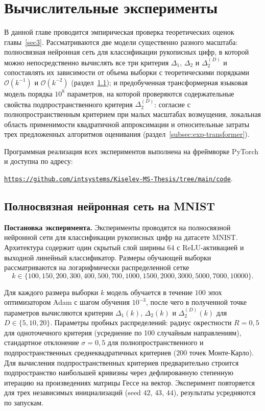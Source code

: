 \section{Вычислительные эксперименты}\label{sec4}

В данной главе проводится эмпирическая проверка теоретических оценок главы~\ref{sec3}. Рассматриваются две модели существенно разного масштаба: полносвязная нейронная сеть для классификации рукописных цифр, в которой можно непосредственно вычислять все три критерия $\Delta_1$, $\Delta_2$ и $\Delta_2^{(D)}$ и сопоставлять их зависимости от объема выборки с теоретическими порядками $\mathcal O(k^{-1})$ и $\mathcal O(k^{-2})$ (раздел~\ref{subsec:exp-mlp}); и предобученная трансформерная языковая модель порядка $10^8$ параметров, на которой проверяются содержательные свойства подпространственного критерия $\Delta_2^{(D)}$: согласие с полнопространственным критерием при малых масштабах возмущения, локальная область применимости квадратичной аппроксимации и относительные затраты трех предложенных алгоритмов оценивания (раздел~\ref{subsec:exp-transformer}).

Программная реализация всех экспериментов выполнена на фреймворке PyTorch и доступна по адресу:
\begin{center}
    \href{https://github.com/intsystems/Kiselev-MS-Thesis/tree/main/code}{\texttt{https://github.com/intsystems/Kiselev-MS-Thesis/tree/main/code}}.
\end{center}

\subsection{Полносвязная нейронная сеть на MNIST}\label{subsec:exp-mlp}

\textbf{Постановка эксперимента.} Эксперименты проводятся на полносвязной нейронной сети для классификации рукописных цифр на датасете MNIST. Архитектура содержит один скрытый слой ширины $64$ с ReLU-активацией и выходной линейный классификатор. Размеры обучающей выборки рассматриваются на логарифмически распределенной сетке
\[
k \in \{100, 150, 200, 300, 400, 500, 700, 1000, 1500, 2000, 3000, 5000, 7000, 10000\}.
\]

Для каждого размера выборки $k$ модель обучается в течение $100$ эпох оптимизатором Adam с шагом обучения $10^{-3}$, после чего в полученной точке параметров вычисляются критерии $\Delta_1(k)$, $\Delta_2(k)$ и $\Delta_2^{(D)}(k)$ для $D \in \{5, 10, 20\}$. Параметры пробных распределений: радиус окрестности $R=0{,}5$ для одноточечного критерия (усреднение по 100 случайным направлениям), стандартное отклонение $\sigma=0{,}5$ для полнопространственного и подпространственных среднеквадратичных критериев ($200$ точек Монте-Карло). Для вычисления подпространственных критериев предварительно строится подпространство наибольшей кривизны через дефлированную степенную итерацию на произведениях матрицы Гессе на вектор. Эксперимент повторяется для трех независимых инициализаций (seed $42$, $43$, $44$), результаты усредняются по запускам.

